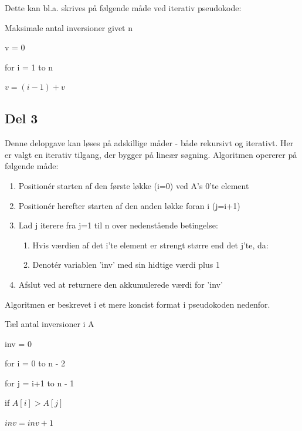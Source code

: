 \documentclass[a4paper,10pt]{article}
\begin{document}
Dette kan bl.a. skrives på følgende måde ved iterativ pseudokode:

\begin{algorithm}
\caption{Maksimale antal inversioner givet n}
\begin{algorithmic}[1]
\State \parbox[t]{.7\linewidth}{v = 0}
\State \parbox[t]{.7\linewidth}{for i = 1 to n}
\Indent
\State \parbox[t]{.7\linewidth}{$v = (i-1) + v$}
\EndIndent
\State {}
\EndFunction
\end{algorithmic}
\end{algorithm}

\subsection*{Del 3}

Denne delopgave kan løses på adskillige måder - både rekursivt og iterativt. Her er valgt en iterativ tilgang, der bygger på lineær søgning. Algoritmen opererer på følgende måde:

\begin{enumerate}
\item{Positionér starten af den første løkke (i=0) ved A's 0'te element}
\item{Positionér herefter starten af den anden løkke foran i (j=i+1)}
\item{Lad j iterere fra j=1 til n over nedenstående betingelse:}
\begin{enumerate}
\item{Hvis værdien af det i'te element er strengt større end det j'te, da:}
\item{Denotér variablen 'inv' med sin hidtige værdi plus 1}
\end{enumerate}
\item{Afslut ved at returnere den akkumulerede værdi for 'inv'}
\end{enumerate}

\pagebreak

Algoritmen er beskrevet i et mere koncist format i pseudokoden nedenfor. 

\begin{algorithm}
\caption{Tæl antal inversioner i A}
\begin{algorithmic}[2]
\State \parbox[t]{.7\linewidth}{inv = 0}
\State \parbox[t]{.7\linewidth}{for i = 0 to n - 2}
\Indent
\State \parbox[t]{.7\linewidth}{for j = i+1 to n - 1}
\Indent
\State \parbox[t]{.7\linewidth}{if $A[i] > A[j]$}
\State \parbox[t]{.7\linewidth}{$inv = inv + 1$}
\EndIndent
\EndIndent
\State {}
\EndFunction
\end{algorithmic}
\end{algorithm}
\end{document}
